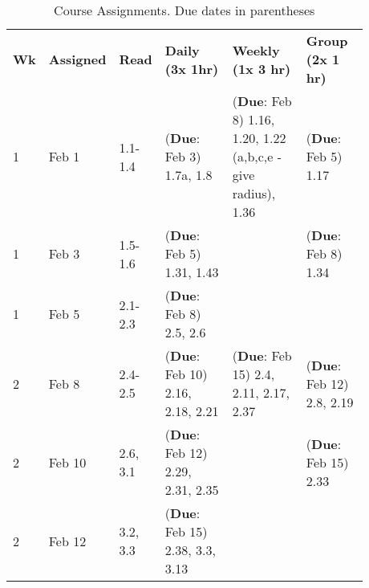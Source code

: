 \documentclass[12pt]{article}
\begin{document}
\newpage























 
\setlength{\arrayrulewidth}{.4mm}
\setlength{\tabcolsep}{8pt}
{
  \begin{table}[]
    \footnotesize
\caption{\footnotesize{Course Assignments. Due dates in parentheses}}
\label{tab:course-assignments}
\begin{tabular}{p{0.03\linewidth}|p{0.08\linewidth}|p{0.065\linewidth}|p{0.25\linewidth}|p{0.25\linewidth}|p{0.2\linewidth}}
\textbf{Wk} & \textbf{Assigned} & \textbf{Read}           & \textbf{Daily (3x 1hr)}            & \textbf{Weekly (1x 3 hr)}                                       & \textbf{Group (2x 1 hr)}    \\
1  & Feb 1    & 1.1-1.4        & (\textbf{Due}: Feb 3) 1.7a, 1.8    & (\textbf{Due}: Feb 8) 1.16, 1.20, 1.22 (a,b,c,e - give radius), 1.36 & (\textbf{Due}: Feb 5) 1.17       \\
1  & Feb 3    & 1.5-1.6        & (\textbf{Due}: Feb 5) 1.31, 1.43        &                                                        & (\textbf{Due}: Feb 8) 1.34       \\
1  & Feb 5    & 2.1-2.3        & (\textbf{Due}: Feb 8) 2.5, 2.6          &                                                        &                    \\
2  & Feb 8    & 2.4-2.5        & (\textbf{Due}: Feb 10) 2.16, 2.18, 2.21 & (\textbf{Due}: Feb 15) 2.4, 2.11, 2.17, 2.37                         & (\textbf{Due}: Feb 12) 2.8, 2.19 \\
2  & Feb 10   & 2.6, 3.1       & (\textbf{Due}: Feb 12) 2.29, 2.31, 2.35 &                                                        & (\textbf{Due}: Feb 15) 2.33      \\
2  & Feb 12   & 3.2, 3.3       & (\textbf{Due}: Feb 15) 2.38, 3.3, 3.13  &                                                        &                    \\

\end{tabular}
\end{table}}
\end{document}
